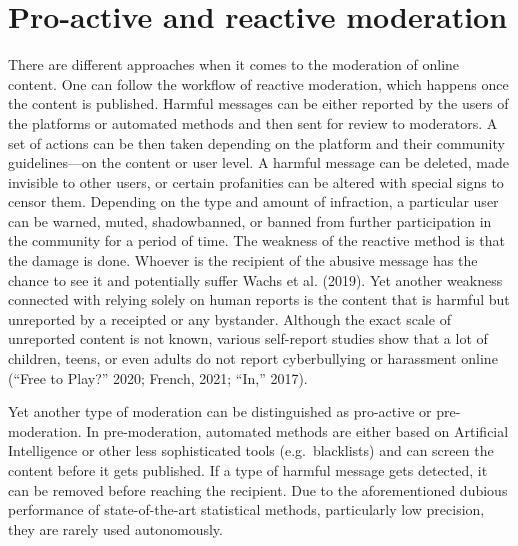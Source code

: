 \documentclass[
  10pt,
  dvipsnames,enabledeprecatedfontcommands]{scrartcl}
\begin{document}
\hypertarget{pro-active-and-reactive-moderation}{%
\section{Pro-active and reactive
moderation}\label{pro-active-and-reactive-moderation}}

There are different approaches when it comes to the moderation of online
content. One can follow the workflow of reactive moderation, which
happens once the content is published. Harmful messages can be either
reported by the users of the platforms or automated methods and then
sent for review to moderators. A set of actions can be then taken
depending on the platform and their community guidelines---on the
content or user level. A harmful message can be deleted, made invisible
to other users, or certain profanities can be altered with special signs
to censor them. Depending on the type and amount of infraction, a
particular user can be warned, muted, shadowbanned, or banned from
further participation in the community for a period of time. The
weakness of the reactive method is that the damage is done. Whoever is
the recipient of the abusive message has the chance to see it and
potentially suffer Wachs et al. (2019). Yet another weakness connected
with relying solely on human reports is the content that is harmful but
unreported by a receipted or any bystander. Although the exact scale of
unreported content is not known, various self-report studies show that a
lot of children, teens, or even adults do not report cyberbullying or
harassment online ({``Free to {Play}?''} 2020; French, 2021; {``In,''}
2017).

Yet another type of moderation can be distinguished as pro-active or
pre-moderation. In pre-moderation, automated methods are either based on
Artificial Intelligence or other less sophisticated tools
(e.g.~blacklists) and can screen the content before it gets published.
If a type of harmful message gets detected, it can be removed before
reaching the recipient. Due to the aforementioned dubious performance of
state-of-the-art statistical methods, particularly low precision, they
are rarely used autonomously.
\end{document}
